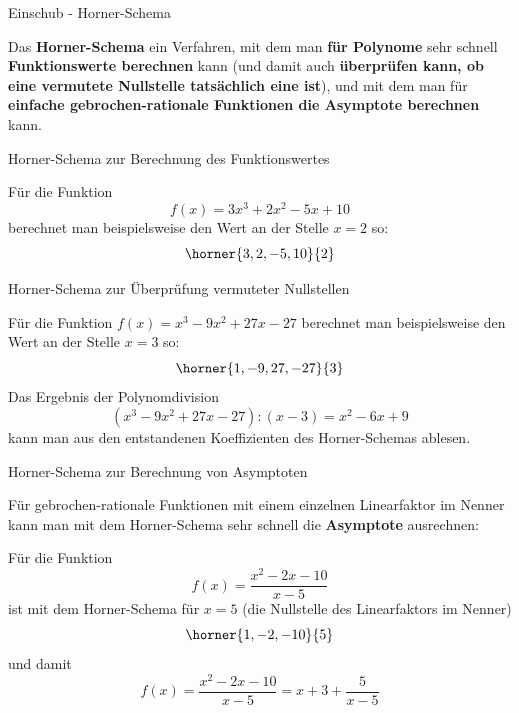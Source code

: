 \begin{frame}{Einschub - Horner-Schema}
	\begin{bemerkung}
		Das \textbf{Horner-Schema} ein Verfahren, mit dem man \textbf{für Polynome} sehr schnell \textbf{Funktionswerte berechnen} kann (und damit auch \textbf{überprüfen kann, ob eine vermutete Nullstelle tatsächlich eine ist}), und mit dem man für \textbf{einfache gebrochen-rationale Funktionen die Asymptote berechnen} kann.
	\end{bemerkung}
\end{frame}		
\begin{frame}{Horner-Schema zur Berechnung des Funktionswertes}
	\begin{example}
		Für die Funktion \[ f(x)=3x^{3} + 2x^{2} -5 x +10 \] berechnet man beispielsweise den Wert an der Stelle $x=2$ so:
		\[
		\horner{3,2,-5,10}{2}
		\]
	\end{example}
\end{frame}

\begin{frame}{Horner-Schema zur Überprüfung vermuteter Nullstellen}
		\begin{example}
			Für die Funktion $f(x)=x^{3} -9x^{2} +27x -27$ berechnet man beispielsweise den Wert an der Stelle $x=3$ so:
			\[
			\horner{1,-9,27,-27}{3}
			\]
			Das Ergebnis der Polynomdivision
			\[
			\left( x^{3} -9x^{2} +27x -27 \right) : (x-3) = x^2-6x+9
			\]
			kann man aus den entstandenen Koeffizienten des Horner-Schemas ablesen.
		\end{example}
\end{frame}

\begin{frame}{Horner-Schema zur Berechnung von Asymptoten}
	\begin{example}
		Für gebrochen-rationale Funktionen mit einem einzelnen Linearfaktor im Nenner kann man mit dem Horner-Schema sehr schnell die \textbf{Asymptote} ausrechnen:
		
		Für die Funktion
		\[
		f(x)=\frac{x^{2}-2x-10}{x-5}
		\]
		ist mit dem Horner-Schema für $x=5$ (die Nullstelle des Linearfaktors im Nenner)
		\[
		\horner{1,-2,-10}{5}
		\]
		und damit
		\[
		f(x)=\frac{x^{2}-2x-10}{x-5} = x+3 + \frac{5}{x-5}
		\]
	\end{example}
\end{frame}